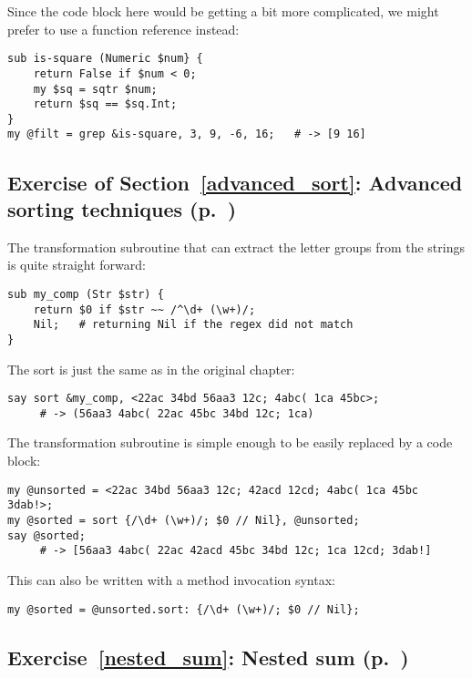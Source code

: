 Since the code block here would be getting a bit more 
complicated, we might prefer to use a function 
reference instead:

\begin{verbatim}
sub is-square (Numeric $num} { 
    return False if $num < 0;
    my $sq = sqtr $num;
    return $sq == $sq.Int;
} 
my @filt = grep &is-square, 3, 9, -6, 16;   # -> [9 16]
\end{verbatim}
%
\subsection{Exercise of Section~\ref{advanced_sort}: Advanced sorting techniques (p.~\pageref{sort_exercise})}
\label{sol_sort_exercise}

The transformation subroutine that can extract the letter 
groups from the strings is quite straight forward:

\begin{verbatim}
sub my_comp (Str $str) {
    return $0 if $str ~~ /^\d+ (\w+)/; 
    Nil;   # returning Nil if the regex did not match
}
\end{verbatim}
%
The sort is just the same as in the original chapter:
\begin{verbatim}
say sort &my_comp, <22ac 34bd 56aa3 12c; 4abc( 1ca 45bc>;
     # -> (56aa3 4abc( 22ac 45bc 34bd 12c; 1ca)
\end{verbatim}

The transformation subroutine is simple enough to be easily 
replaced by a code block:

\begin{verbatim}
my @unsorted = <22ac 34bd 56aa3 12c; 42acd 12cd; 4abc( 1ca 45bc 3dab!>;
my @sorted = sort {/\d+ (\w+)/; $0 // Nil}, @unsorted;
say @sorted; 
     # -> [56aa3 4abc( 22ac 42acd 45bc 34bd 12c; 1ca 12cd; 3dab!]
\end{verbatim}
%
This can also be written with a method invocation syntax:
\begin{verbatim}
my @sorted = @unsorted.sort: {/\d+ (\w+)/; $0 // Nil};
\end{verbatim}
%

\subsection{Exercise~\ref{nested_sum}: Nested sum (p.~\pageref{nested_sum})}
\label{sol_nested_sum}

